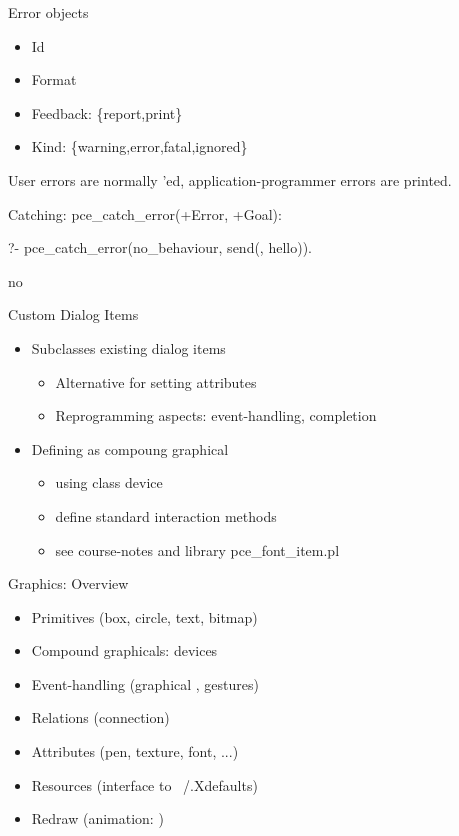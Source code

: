 \begin{sli}{Error objects}

\begin{itemize}
    \item Id
    \item Format
    \item Feedback: \{report,print\}
    \item Kind: \{warning,error,fatal,ignored\}
\end{itemize}

User errors are normally 'ed, application-programmer errors
are printed.

Catching: pce_catch_error(+Error, +Goal):

?- pce_catch_error(no_behaviour, send(, hello)).

no
\end{sli}


\begin{sli}{Custom Dialog Items}

\begin{itemize}
    \item Subclasses existing dialog items
    \begin{itemize}
        \item Alternative for setting attributes
	\item Reprogramming aspects: event-handling, completion
    \end{itemize}
    \item Defining as compoung graphical
    \begin{itemize}
	\item using class device
	\item define standard interaction methods
	\item see course-notes and library pce_font_item.pl
    \end{itemize}
\end{itemize}
\end{sli}






\begin{sli}{Graphics: Overview}
\begin{itemize}
    \item Primitives (box, circle, text, bitmap)
    \item Compound graphicals: devices
    \item Event-handling (graphical , gestures)
    \item Relations (connection)
    \item Attributes (pen, texture, font, ...)
    \item Resources (interface to ~/.Xdefaults) 
    \item Redraw (animation: )
\end{itemize}
\end{sli}


